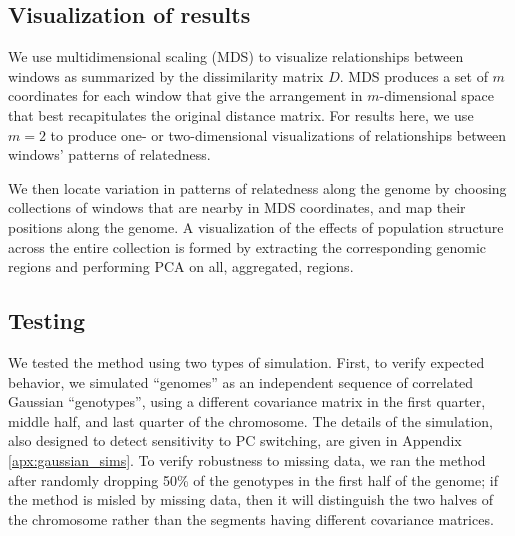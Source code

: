 \documentclass[11pt, oneside]{article}   	%
\begin{document}
\subsection{Visualization of results}

We use multidimensional scaling (MDS) to visualize relationships between windows
as summarized by the dissimilarity matrix $D$.
MDS produces a set of $m$ coordinates for each window that
give the arrangement in $m$-dimensional space that best recapitulates the original distance matrix.
For results here, we use $m=2$ to produce one- or two-dimensional visualizations of relationships between windows' patterns of relatedness.

We then locate variation in patterns of relatedness along the genome
by choosing collections of windows that are nearby in MDS coordinates,
and map their positions along the genome.
A visualization of the effects of population structure across the entire collection is formed by extracting the corresponding genomic regions
and performing PCA on all, aggregated, regions.

\subsection{Testing}
\label{ss:testing_methods}

We tested the method using two types of simulation.
First, to verify expected behavior, we simulated ``genomes'' as an independent sequence
of correlated Gaussian ``genotypes'', using a different covariance matrix
in the first quarter, middle half, and last quarter of the chromosome.
The details of the simulation,
also designed to detect sensitivity to PC switching,
are given in Appendix \ref{apx:gaussian_sims}.
To verify robustness to missing data,
we ran the method after randomly dropping 50\% of the genotypes in the first half of the genome;
if the method is misled by missing data, then it will distinguish the two halves of the chromosome
rather than the segments having different covariance matrices.
\end{document}

